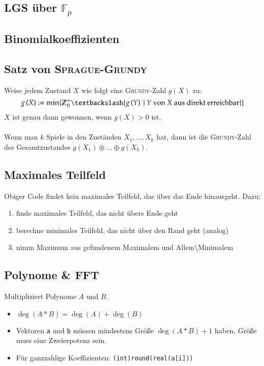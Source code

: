 \subsection{LGS über $\mathbb{F}_p$}


\subsection{Binomialkoeffizienten}


\subsection{Satz von \textsc{Sprague-Grundy}}
Weise jedem Zustand $X$ wie folgt eine \textsc{Grundy}-Zahl $g\left(X\right)$ zu:
\[
	g\left(X\right) := \min\{ \mathbb{Z}_0^+ \textbackslash \{g\left(Y\right)~|~Y \text{ von } X \text{ aus direkt erreichbar}\}\} 
\]
$X$ ist genau dann gewonnen, wenn $g\left(X\right) > 0$ ist.\\\\
Wenn man $k$ Spiele in den Zuständen $X_1, \ldots, X_k$ hat, dann ist die \textsc{Grundy}-Zahl des Gesamtzustandes $g\left(X_1\right) \oplus \ldots \oplus g\left(X_k\right)$.


\subsection{Maximales Teilfeld}

Obiger Code findet kein maximales Teilfeld, das über das Ende hinausgeht. Dazu:
\begin{enumerate}
	\item finde maximales Teilfeld, das nicht übers Ende geht
	\item berechne minimales Teilfeld, das nicht über den Rand geht (analog)
	\item nimm Maximum aus gefundenem Maximalem und Allem\textbackslash Minimalem
\end{enumerate}

\subsection{Polynome \& FFT}
Multipliziert Polynome $A$ und $B$.
\begin{itemize}
	\item $\deg(A * B) = \deg(A) + \deg(B)$
	\item Vektoren \lstinline{a} und \lstinline{b} müssen mindestens Größe $\deg(A * B) + 1$ haben.
	Größe muss eine Zweierpotenz sein.
	\item Für ganzzahlige Koeffizienten: \lstinline{(int)round(real(a[i]))}
\end{itemize}


